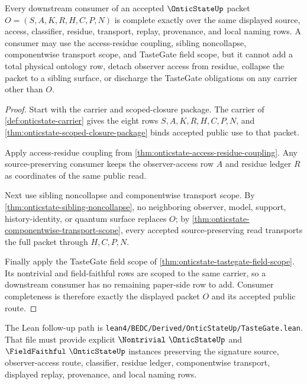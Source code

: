 \begin{theorem}
\label{thm:onticstate-mature-consumer-completeness}
Every downstream consumer of an accepted $\OnticStateUp$ packet $O=(S,A,K,R,H,C,P,N)$ is complete exactly over the same displayed source, access, classifier, residue, transport, replay, provenance, and local naming rows. A consumer may use the access-residue coupling, sibling noncollapse, componentwise transport scope, and TasteGate field scope, but it cannot add a total physical ontology row, detach observer access from residue, collapse the packet to a sibling surface, or discharge the TasteGate obligations on any carrier other than $O$.
\end{theorem}
\begin{proof}
Start with the carrier and scoped-closure package. The carrier of \autoref{def:onticstate-carrier} gives the eight rows $S,A,K,R,H,C,P,N$, and \autoref{thm:onticstate-scoped-closure-package} binds accepted public use to that packet.

Apply access-residue coupling from \autoref{thm:onticstate-access-residue-coupling}. Any source-preserving consumer keeps the observer-access row $A$ and residue ledger $R$ as coordinates of the same public read.

Next use sibling noncollapse and componentwise transport scope. By \autoref{thm:onticstate-sibling-noncollapse}, no neighboring observer, model, support, history-identity, or quantum surface replaces $O$; by \autoref{thm:onticstate-componentwise-transport-scope}, every accepted source-preserving read transports the full packet through $H,C,P,N$.

Finally apply the TasteGate field scope of \autoref{thm:onticstate-tastegate-field-scope}. Its nontrivial and field-faithful rows are scoped to the same carrier, so a downstream consumer has no remaining paper-side row to add. Consumer completeness is therefore exactly the displayed packet $O$ and its accepted public route.
\end{proof}

The Lean follow-up path is \texttt{lean4/BEDC/Derived/OnticStateUp/TasteGate.lean}. That file must provide explicit $\Nontrivial\ \OnticStateUp$ and $\FieldFaithful\ \OnticStateUp$ instances preserving the signature source, observer-access route, classifier, residue ledger, componentwise transport, displayed replay, provenance, and local naming rows.


